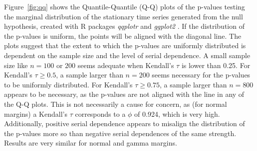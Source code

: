 \documentclass[APA,Times1COL]{WileyNJDv5} %
\begin{document}
Figure~\ref{fig:qq} shows the Quantile-Quantile (Q-Q)
plots of the p-values testing the marginal distribution of the stationary time
series generated from the null hypothesis, created with R packages
\textsl{qqplotr} and \textsl{ggplot2} \citep{qqplotr, ggplot2}. If the
distribution of the p-values is uniform, the points will be aligned with the
diagonal line. The plots suggest that the extent to which the p-values are
uniformly distributed is dependent on the sample size and the level of serial 
dependence.
A small sample size like $n = 100$ or $200$ seems adequate when Kendall's
$\tau$ is lower than 0.25. For Kendall's $\tau \geq 0.5$, a sample larger than
$n = 200$ seems necessary for the p-values to be uniformly distributed. For
Kendall's $\tau \geq 0.75$, a sample larger than $n = 800$ appears to be 
necessary, as the p-values are not aligned with the line in any of the Q-Q 
plots. This
is not necessarily a cause for concern, as (for normal margins)
a Kendall's $\tau$ corresponds to
a $\phi$ of 0.924, which is very high.
Additionally, positive serial dependence appears to misalign the distribution
of the p-values more so than negative serial dependences of the same strength.
Results are very similar for normal and gamma margins.
\end{document}
